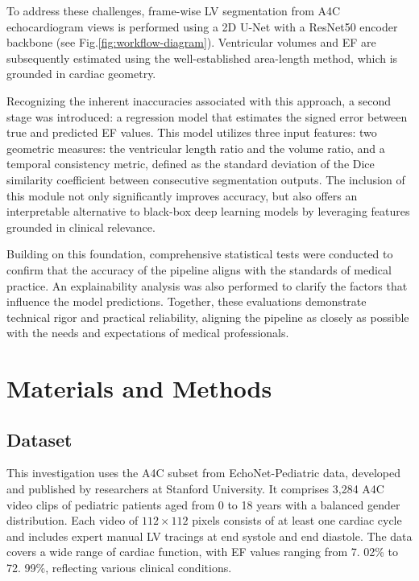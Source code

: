 \documentclass[runningheads]{llncs}
\begin{document}
To address these challenges, frame-wise LV segmentation from A4C echocardiogram views is performed using a 2D U-Net with a ResNet50 encoder backbone (see Fig.\ref{fig:workflow-diagram}). Ventricular volumes and EF are subsequently estimated using the well-established area-length method, which is grounded in cardiac geometry\cite{Lang2015}.

Recognizing the inherent inaccuracies associated with this approach, a second stage was introduced: a regression model that estimates the signed error between true and predicted EF values. This model utilizes three input features: two geometric measures: the ventricular length ratio and the volume ratio, and a temporal consistency metric, defined as the standard deviation of the Dice similarity coefficient between consecutive segmentation outputs. The inclusion of this module not only significantly improves accuracy, but also offers an interpretable alternative to black-box deep learning models by leveraging features grounded in clinical relevance.

Building on this foundation, comprehensive statistical tests were conducted to confirm that the accuracy of the pipeline aligns with the standards of medical practice. An explainability analysis was also performed to clarify the factors that influence the model predictions. Together, these evaluations demonstrate technical rigor and practical reliability, aligning the pipeline as closely as possible with the needs and expectations of medical professionals.

\section{Materials and Methods}

\subsection{Dataset}
This investigation uses the A4C subset from EchoNet-Pediatric data\cite{echonetpediatric2023}, developed and published by researchers at Stanford University. It comprises 3,284 A4C video clips of pediatric patients aged from 0 to 18 years with a balanced gender distribution. Each video of $112\times112$ pixels consists of at least one cardiac cycle and includes expert manual LV tracings at end systole and end diastole. The data covers a wide range of cardiac function, with EF values ranging from 7. 02\% to 72. 99\%, reflecting various clinical conditions.
\end{document}
